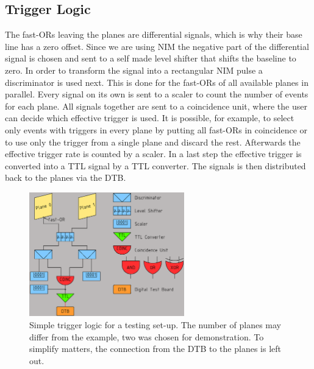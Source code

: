 \documentclass[british,11pt,a4paper]{memoir}
\begin{document}
\subsection{Trigger Logic}\label{striglog1}
The fast-ORs leaving the planes are differential signals, which is why their base line has a zero offset. Since we are using NIM the negative part of the differential signal is chosen and sent to a self made level shifter that shifts the baseline to zero. In order to transform the signal into a rectangular NIM pulse a discriminator is used next. This is done for the fast-ORs of all available planes in parallel. Every signal on its own is sent to a scaler to count the number of events for each plane. All signals together are sent to a coincidence unit, where the user can decide which effective trigger is used. It is possible, for example, to select only events with triggers in every plane by putting all fast-ORs in coincidence or to use only the trigger from a single plane and discard the rest. Afterwards the effective trigger rate is counted by a scaler. In a last step the effective trigger is converted into a \ac{TTL} signal by a \ac{TTL} converter. The signals is then distributed back to the planes via the \ac{DTB}.
\begin{figure}[ht]
	\centering
	\includegraphics[width=0.6\textwidth]{triglog1}
	\caption{Simple trigger logic for a testing set-up. The number of planes may differ from the example, two was chosen for demonstration. To simplify matters, the connection from the \ac{DTB} to the planes is left out.}
	\label{plogic1}
\end{figure}\no
\end{document}
